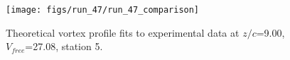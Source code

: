 \begin{figure}[H]
\centering
\texttt{[image: figs/run\_47/run\_47\_comparison]}
\caption{Theoretical vortex profile fits to experimental data at $z/c$=9.00, $V_{free}$=27.08, station 5.}
\label{fig:run_47_comparison}
\end{figure}


